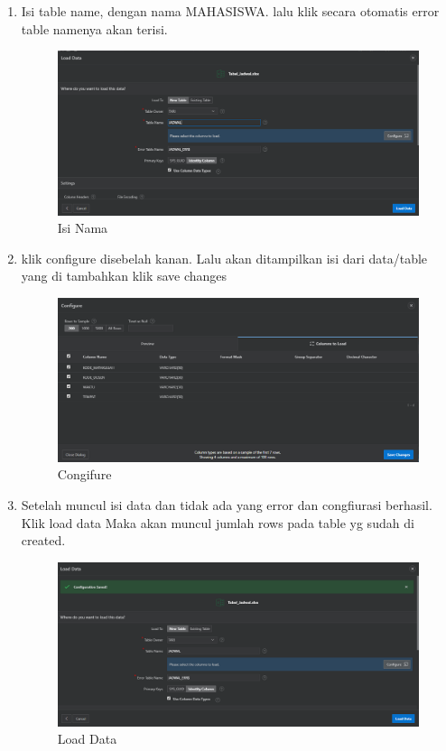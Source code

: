 \begin{enumerate}
    \item Isi table name, dengan nama MAHASISWA. lalu klik secara otomatis error table namenya akan terisi.
    \begin{figure}[!htbp]
        \centering
        \includegraphics[width=13cm]{figures/namedata.PNG}
        \caption{Isi Nama}
    \end{figure}

    \item klik configure disebelah kanan. Lalu akan ditampilkan isi dari data/table yang di tambahkan klik save changes
    \begin{figure}[!htbp]
        \centering
        \includegraphics[width=13cm]{figures/2.PNG}
        \caption{Congifure}
    \end{figure}
    
    \newpage
    \item Setelah muncul isi data dan tidak ada yang error dan congfiurasi berhasil. Klik load data Maka akan muncul jumlah rows pada table yg sudah di created. 
    \begin{figure}[!htbp]
        \centering
        \includegraphics[width=13cm]{figures/3.PNG}
        \caption{Load Data}
    \end{figure}


\end{enumerate}
